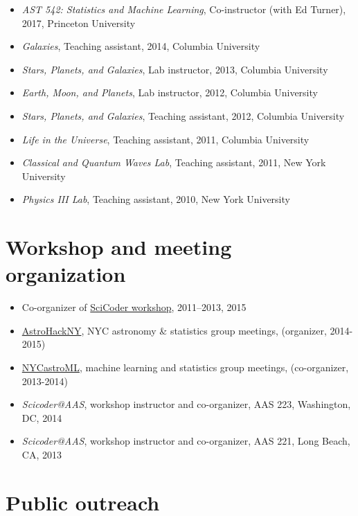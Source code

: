 \documentclass[12pt,letterpaper]{article}
\begin{document}
\begin{itemize}
	\item \emph{AST 542: Statistics and Machine Learning},  Co-instructor (with Ed Turner), 2017, Princeton University
    \item \emph{Galaxies}, Teaching assistant, 2014, Columbia University
	\item \emph{Stars, Planets, and Galaxies}, Lab instructor, 2013, Columbia University
	\item \emph{Earth, Moon, and Planets}, Lab instructor, 2012, Columbia University
	\item \emph{Stars, Planets, and Galaxies}, Teaching assistant, 2012, Columbia University
	\item \emph{Life in the Universe}, Teaching assistant, 2011, Columbia University
	\item \emph{Classical and Quantum Waves Lab}, Teaching assistant, 2011, New York University
	\item \emph{Physics III Lab}, Teaching assistant, 2010, New York University
\end{itemize}

\section*{Workshop and meeting organization}

\begin{itemize}
    \item Co-organizer of \href{http://scicoder.org}{SciCoder workshop}, 2011--2013, 2015
    \item \href{https://groups.google.com/forum/#!forum/astrohackny}{AstroHackNY}, NYC astronomy \& statistics group meetings, (organizer, 2014-2015)
    \item \href{https://github.com/adrn/nycastroml}{NYCastroML}, machine learning and statistics group meetings, (co-organizer, 2013-2014)
    \item \emph{Scicoder@AAS}, workshop instructor and co-organizer, AAS 223, Washington, DC, 2014
    \item \emph{Scicoder@AAS}, workshop instructor and co-organizer, AAS 221, Long Beach, CA, 2013
\end{itemize}

\section*{Public outreach}
\end{document}
